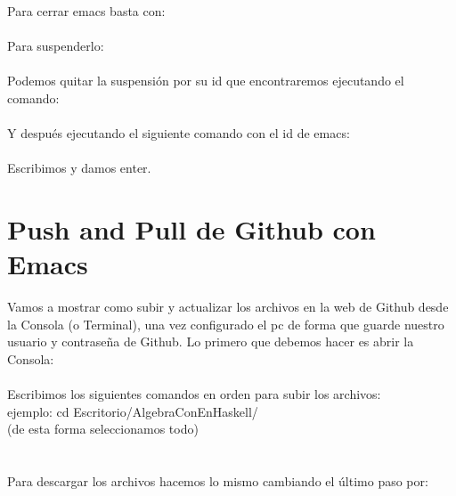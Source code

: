 Para cerrar emacs basta con:\\
\\

Para suspenderlo:\\
\\

Podemos quitar la suspensión por su id que encontraremos ejecutando el comando:\\

\\

Y después ejecutando el siguiente comando con el id de emacs:\\

\\

Escribimos  y damos enter. \\


\chapter{Push and Pull de Github con Emacs}\label{aped.C}

Vamos a mostrar como subir y actualizar los archivos en la web de Github desde la Consola (o Terminal), una vez configurado el pc de forma que guarde nuestro usuario y contraseña de Github. Lo primero que debemos hacer es abrir la Consola:\\

\\

Escribimos los siguientes comandos en orden para subir los archivos:\\

 ejemplo: cd Escritorio/AlgebraConEnHaskell/ \\

 (de esta forma seleccionamos todo)\\

\\

\\


Para descargar los archivos hacemos lo mismo cambiando el último paso por:\\

\\


